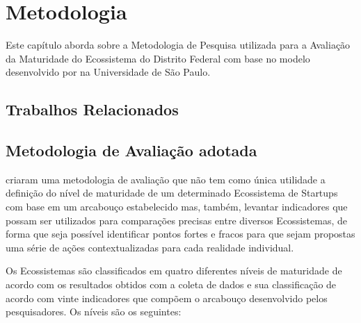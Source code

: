 \chapter[Metodologia]{Metodologia}
\label{cap-metodologia}

Este capítulo aborda sobre a Metodologia de Pesquisa utilizada para a Avaliação da Maturidade do Ecossistema do Distrito Federal com base no modelo desenvolvido por  na Universidade de São Paulo.

\section{Trabalhos Relacionados}
\label{section:trabalhos_relacionados}

\section{Metodologia de Avaliação adotada}
\label{section:framework_adotado}

 criaram uma metodologia de avaliação que não tem como única utilidade a definição do nível de maturidade de um determinado Ecossistema de Startups com base em um arcabouço estabelecido mas, também, levantar indicadores que possam ser utilizados para comparações precisas entre diversos Ecossistemas, de forma que seja possível identificar pontos fortes e fracos para que sejam propostas uma série de ações contextualizadas para cada realidade individual.

Os Ecossistemas são classificados em quatro diferentes níveis de maturidade de acordo com os resultados obtidos com a coleta de dados e sua classificação de acordo com vinte indicadores que compõem o arcabouço desenvolvido pelos pesquisadores. Os níveis são os seguintes:

